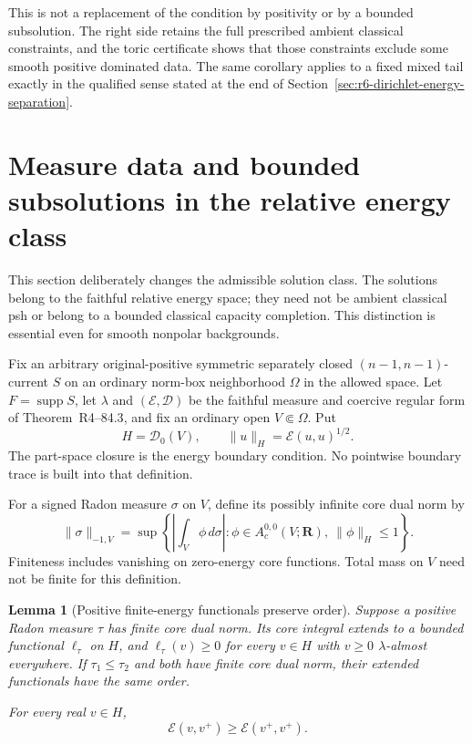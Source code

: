 \documentclass[11pt,a4paper]{article}
\numberwithin{equation}{section}
\newtheorem{lemma}[theorem]{Lemma}
\theoremstyle{definition}
\theoremstyle{remark}
\begin{document}
This is not a replacement of the condition by positivity or by a bounded
subsolution. The right side retains the full prescribed ambient
classical constraints, and the toric certificate shows that those
constraints exclude some smooth positive dominated data. The same
corollary applies to a fixed mixed tail exactly in the qualified sense
stated at the end of Section~\ref{sec:r6-dirichlet-energy-separation}.



\section{Measure data and bounded subsolutions in the relative energy class}
\label{sec:r6-relative-energy-data}

This section deliberately changes the admissible solution class. The
solutions belong to the faithful relative energy space; they need not
be ambient classical psh or belong to a bounded classical capacity
completion. This distinction is essential even for smooth nonpolar
backgrounds.

Fix an arbitrary original-positive symmetric separately closed
$(n-1,n-1)$-current $S$ on an ordinary norm-box neighborhood $\Omega$
in the allowed space. Let $F=\operatorname{supp}S$, let $\lambda$ and
$(\mathcal E,\mathscr D)$ be the faithful measure and coercive regular
form of Theorem~\textup{R4--84.3}, and fix an
ordinary open $V\Subset\Omega$. Put
\[
                  H=\mathscr D_0(V),\qquad
                  \|u\|_H=\mathcal E(u,u)^{1/2}.
\]
The part-space closure is the energy boundary condition. No pointwise
boundary trace is built into that definition.

For a signed Radon measure $\sigma$ on $V$, define its possibly infinite
core dual norm by
\[
 \|\sigma\|_{-1,V}
   =\sup\left\{\left|\int_V\phi\,d\sigma\right|:
       \phi\in A_c^{0,0}(V;\mathbf R),\ \|\phi\|_H\le1\right\}.
\]
Finiteness includes vanishing on zero-energy core functions. Total mass
on $V$ need not be finite for this definition.

\begin{lemma}[Positive finite-energy functionals preserve order]
\label{lem:r6-positive-energy-data}
Suppose a positive Radon measure $\tau$ has finite core dual norm.
Its core integral extends to a bounded functional $\ell_\tau$ on $H$,
and $\ell_\tau(v)\ge0$ for every $v\in H$ with $v\ge0$
$\lambda$-almost everywhere. If $\tau_1\le\tau_2$ and both have
finite core dual norm, their extended functionals have the same order.

For every real $v\in H$,
\[
                    \mathcal E(v,v^+)\ge\mathcal E(v^+,v^+).
\]
\end{lemma}
\end{document}
